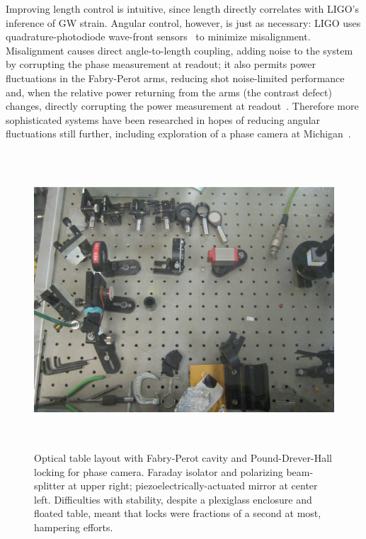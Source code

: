 Improving length control is intuitive, since length directly correlates with LIGO's inference of GW strain.
Angular control, however, is just as necessary: LIGO uses quadrature-photodiode wave-front sensors~\cite{MavalvalaThesis} to minimize misalignment.
Misalignment causes direct angle-to-length coupling, adding noise to the system by corrupting the phase measurement at readout; it also permits power fluctuations in the Fabry-Perot arms, reducing shot noise-limited performance and, when the relative power returning from the arms (the contrast defect) changes, directly corrupting the power measurement at readout~\cite{DooleyThesis}.
Therefore more sophisticated systems have been researched in hopes of reducing angular fluctuations still further, including exploration of a phase camera at Michigan~\cite{DergachevThesis}.

\begin{figure}
\begin{center}
\includegraphics[height=111mm, width=148mm]{Optical_table_phase_camera.eps}
\caption{Optical table layout with Fabry-Perot cavity and Pound-Drever-Hall locking for phase camera. Faraday isolator and polarizing beam-splitter at upper right; piezoelectrically-actuated mirror at center left. Difficulties with stability, despite a plexiglass enclosure and floated table, meant that locks were fractions of a second at most, hampering efforts.}
\label{phase_camera_optical_table}
\end{center}
\end{figure}

